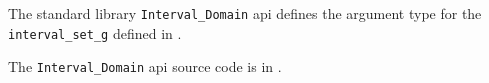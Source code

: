 
The standard library {\tt Interval\_Domain} api defines the argument type for the 
{\tt interval\_set\_g} defined in .

The {\tt Interval\_Domain} api source code is in .






